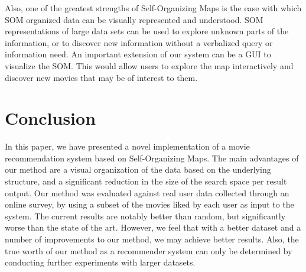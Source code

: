 \documentclass[conference]{IEEEtran}
\begin{document}
Also, one of the greatest strengths of Self-Organizing Maps is the ease with which SOM organized data can be visually represented and understood. SOM representations of large data sets can be used to explore unknown parts of the information, or to discover new information without a verbalized query or information need. An important extension of our system can be a GUI to visualize the SOM. This would allow users to explore the map interactively and discover new movies that may be of interest to them.



\section{Conclusion}
In this paper, we have presented a novel implementation of a movie recommendation system based on Self-Organizing Maps. The main advantages of our method are a visual organization of the data based on the underlying structure, and a significant reduction in the size of the search space per result output. Our method was evaluated against real user data collected through an online survey, by using a subset of the movies liked by each user as input to the system. The current results are notably better than random, but significantly worse than the state of the art. However, we feel that with a better dataset and a number of improvements to our method, we may achieve better results. Also, the true worth of our method as a recommender system can only be determined by conducting further experiments with larger datasets.  
\end{document}
